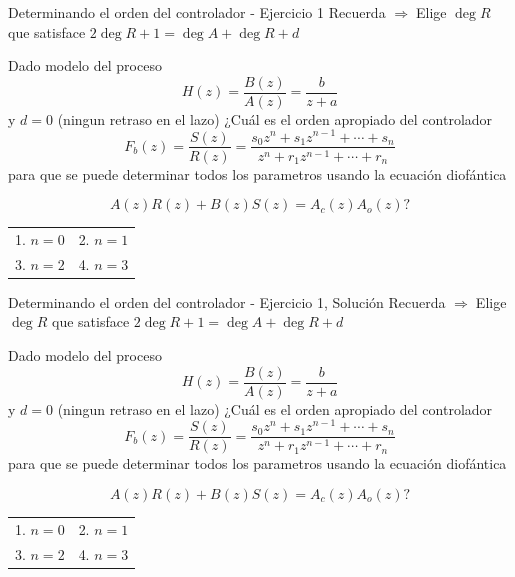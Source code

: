 \documentclass[presentation,aspectratio=169]{beamer}
\begin{document}
\begin{frame}[label={sec:orgc5291df}]{Determinando el orden del controlador - Ejercicio 1}
Recuerda    \alert{\(\Rightarrow\;\)Elige \(\deg R\) que satisface \(2\deg R + 1 = \deg A + \deg R + d\)}

   Dado modelo del proceso \[H(z) = \frac{B(z)}{A(z)} = \frac{b}{z + a}\] y \(d=0\) (ningun retraso en el lazo) ¿Cuál es el orden apropiado del controlador 
\[F_b(z) = \frac{S(z)}{R(z)} = \frac{s_0z^n + s_1z^{n-1} + \cdots + s_n}{z^n + r_1 z^{n-1} + \cdots + r_n}\]
para que se puede determinar todos los parametros usando la ecuación diofántica

\[ A(z)R(z) + B(z)S(z) = A_c(z)A_o(z)?\]
\begin{center}
\begin{tabular}{ll}
1. \(n = 0\) & 2. \(n = 1\)\\
3. \(n=2\) & 4. \(n=3\)\\
\end{tabular}
\end{center}
\end{frame}

\begin{frame}[label={sec:org578b48e}]{Determinando el orden del controlador - Ejercicio 1, Solución}
Recuerda    \alert{\(\Rightarrow\;\)Elige \(\deg R\) que satisface \(2\deg R + 1 = \deg A + \deg R + d\)}

   Dado modelo del proceso \[H(z) = \frac{B(z)}{A(z)} = \frac{b}{z + a}\] y \(d=0\) (ningun retraso en el lazo) ¿Cuál es el orden apropiado del controlador 
\[F_b(z) = \frac{S(z)}{R(z)} = \frac{s_0z^n + s_1z^{n-1} + \cdots + s_n}{z^n + r_1 z^{n-1} + \cdots + r_n}\]
para que se puede determinar todos los parametros usando la ecuación diofántica

\[ A(z)R(z) + B(z)S(z) = A_c(z)A_o(z)?\]
\begin{center}
\begin{tabular}{ll}
1. \(n = 0\) & 2. \(n = 1\)\\
3. \(n=2\) & 4. \(n=3\)\\
\end{tabular}
\end{center}
\end{frame}
\end{document}
